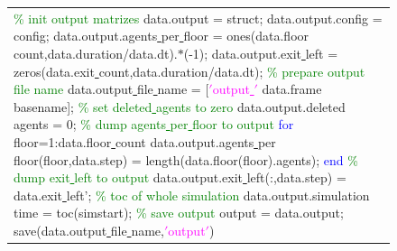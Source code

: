 \documentclass[11pt]{article}
\begin{document}
\begin{figure}[H]
\centering
\begin{tabular}
{|>{\large}m{\textwidth}|} \hline
\bigskip
\textcolor{green}{\% init output matrizes}
\newline
data.output = struct;
\newline
data.output.config = config;
\newline
data.output.agents\underline{ }per\underline{ }floor = ones(data.floor\underline{ }count,data.duration/data.dt).$*$(-1);
\newline
data.output.exit\underline{ }left = zeros(data.exit\underline{ }count,data.duration/data.dt);
\newline
\newline
\textcolor{green}{\% prepare output file name}
\newline
data.output\underline{ }file\underline{ }name = [\textcolor{magenta}{$'$output\underline{ }$'$} data.frame\underline{ }basename];
\newline
\newline
\textcolor{green}{\% set deleted\underline{ }agents to zero}
\newline
data.output.deleted\underline{ }agents = 0;
\newline
\newline
\textcolor{green}{\% dump agents\underline{ }per\underline{ }floor to output }
\newline
\textcolor{blue}{for} floor=1:data.floor\underline{ }count
\newline
data.output.agents\underline{ }per\underline{ }floor(floor,data.step) = length(data.floor(floor).agents);
\newline
\textcolor{blue}{end}
\newline
\newline
\textcolor{green}{\% dump exit\underline{ }left to output}
\newline
data.output.exit\underline{ }left(:,data.step) = data.exit\underline{ }left';
\newline
\newline
\textcolor{green}{\% toc of whole simulation}
\newline
data.output.simulation\underline{ }time = toc(simstart);
\newline
\newline
\textcolor{green}{\% save output}
\newline
output = data.output;
\newline
save(data.output\underline{ }file\underline{ }name,\textcolor{magenta}{$'$output$'$})

\end{tabular}
\end{figure}
\end{document}
